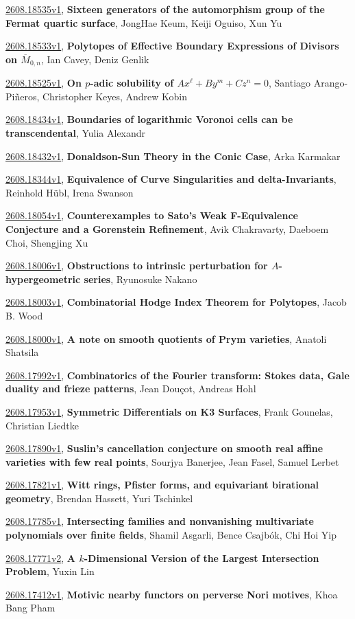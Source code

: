 \documentclass[9pt, a4paper]{article}
\theoremstyle{plain}
\theoremstyle{definition}
\theoremstyle{remark}
\newcommand{\arxiv}[3]{\href{https://arxiv.org/abs/#1}{#1}, \textbf{\textcolor{arxivblue}{#2}}, #3}
\begin{document}
\arxiv{2608.18535v1}{Sixteen generators of the automorphism group of the Fermat quartic surface}{JongHae Keum, Keiji Oguiso, Xun Yu}

\arxiv{2608.18533v1}{Polytopes of Effective Boundary Expressions of Divisors on $\overline{M}_{0,n}$}{Ian Cavey, Deniz Genlik}

\arxiv{2608.18525v1}{On $p$-adic solubility of $Ax^\ell + By^m + Cz^n = 0$}{Santiago Arango-Piñeros, Christopher Keyes, Andrew Kobin}

\arxiv{2608.18434v1}{Boundaries of logarithmic Voronoi cells can be transcendental}{Yulia Alexandr}

\arxiv{2608.18432v1}{Donaldson-Sun Theory in the Conic Case}{Arka Karmakar}

\arxiv{2608.18344v1}{Equivalence of Curve Singularities and delta-Invariants}{Reinhold Hübl, Irena Swanson}

\arxiv{2608.18054v1}{Counterexamples to Sato's Weak F-Equivalence Conjecture and a Gorenstein Refinement}{Avik Chakravarty, Daeboem Choi, Shengjing Xu}

\arxiv{2608.18006v1}{Obstructions to intrinsic perturbation for $A$-hypergeometric series}{Ryunosuke Nakano}

\arxiv{2608.18003v1}{Combinatorial Hodge Index Theorem for Polytopes}{Jacob B. Wood}

\arxiv{2608.18000v1}{A note on smooth quotients of Prym varieties}{Anatoli Shatsila}

\arxiv{2608.17992v1}{Combinatorics of the Fourier transform: Stokes data, Gale duality and frieze patterns}{Jean Douçot, Andreas Hohl}

\arxiv{2608.17953v1}{Symmetric Differentials on K3 Surfaces}{Frank Gounelas, Christian Liedtke}

\arxiv{2608.17890v1}{Suslin's cancellation conjecture on smooth real affine varieties with few real points}{Sourjya Banerjee, Jean Fasel, Samuel Lerbet}

\arxiv{2608.17821v1}{Witt rings, Pfister forms, and equivariant birational geometry}{Brendan Hassett, Yuri Tschinkel}

\arxiv{2608.17785v1}{Intersecting families and nonvanishing multivariate polynomials over finite fields}{Shamil Asgarli, Bence Csajbók, Chi Hoi Yip}

\arxiv{2608.17771v2}{A $k$-Dimensional Version of the Largest Intersection Problem}{Yuxin Lin}

\arxiv{2608.17412v1}{Motivic nearby functors on perverse Nori motives}{Khoa Bang Pham}
\end{document}
